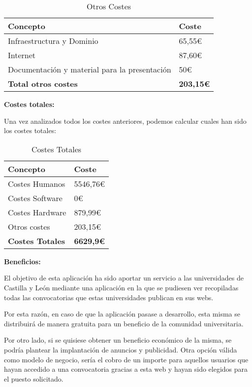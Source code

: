 \begin{table}[H]
    \centering
    \setlength{\tabcolsep}{20pt}
    \begin{tabular}{l l}
        \hline
        \textbf{Concepto} & \textbf{Coste} \\ \hline
        Infraestructura y Dominio & 65,55€ \\
        Internet  & 87,60€\\
        Documentación y material para la presentación & 50€\\  \hline
        \textbf{Total otros costes} & \textbf{203,15€}\\ \hline
    \end{tabular}
    \caption{Otros Costes}
    \label{tab:otros_costes}
\end{table}


\textbf{Costes totales:}

Una vez analizados todos los costes anteriores, podemos calcular cuales han sido los costes totales:

\begin{table}[H]
    \centering
    \renewcommand{\arraystretch}{1.2}
    \setlength{\tabcolsep}{20pt}
    \begin{tabular}{l l}
        \hline
        \textbf{Concepto} & \textbf{Coste} \\ \hline
        Costes Humanos & 5546,76€ \\
        Costes Software & 0€ \\
        Costes Hardware  & 879,99€\\
        Otros costes & 203,15€\\  \hline
        \textbf{Costes Totales} & \textbf{6629,9€}\\ \hline
    \end{tabular}
    \caption{Costes Totales}
    \label{tab:costes_totales}
\end{table}

\textbf{Beneficios:}

El objetivo de esta aplicación ha sido aportar un servicio a las universidades de Castilla y León mediante una aplicación en la que se pudiesen ver recopiladas todas las convocatorias que estas universidades publican en sus webs. 

Por esta razón, en caso de que la aplicación pasase a desarrollo, esta misma se distribuirá de manera gratuita para un beneficio de la comunidad universitaria.

Por otro lado, si se quisiese obtener un beneficio económico de la misma, se podría plantear la implantación de anuncios y publicidad. Otra opción válida como modelo de negocio, sería el cobro de un importe para aquellos usuarios que hayan accedido a una convocatoria gracias a esta web y hayan sido elegidos para el puesto solicitado.

